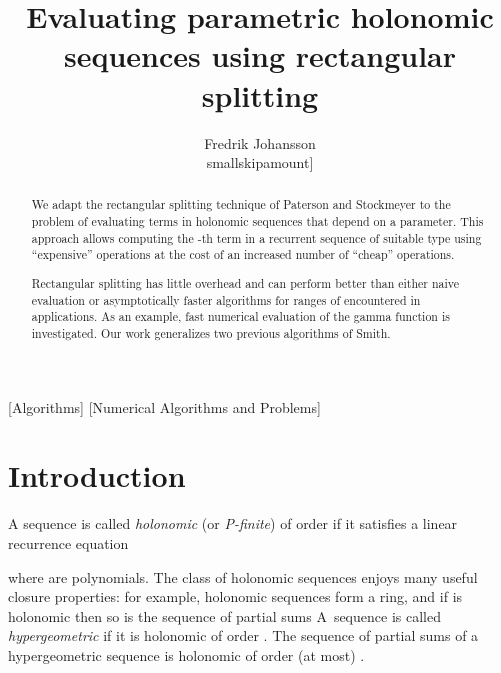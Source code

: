 \documentclass{sig-alternate}
\begin{document}
\title{Evaluating parametric holonomic sequences using rectangular splitting}


\author{\alignauthor Fredrik Johansson\\smallskipamount]
}

\maketitle

\begin{abstract}
We adapt the rectangular splitting technique of
Paterson and Stockmeyer to the problem of evaluating
terms in holonomic sequences that depend on a parameter.
This approach allows computing the -th term
in a recurrent sequence of suitable type using  ``expensive'' operations
at the cost of an increased number of ``cheap'' operations.

Rectangular splitting has little overhead and can perform better
than either naive evaluation or asymptotically faster algorithms
for ranges of  encountered in applications.
As an example,
fast numerical evaluation of the gamma function is investigated.
Our work generalizes two previous algorithms of Smith.
\end{abstract}

[Algorithms]
[Numerical Algorithms and Problems]



\overfullrule=5pt

\section{Introduction}

A sequence  is called \emph{holonomic}
(or \emph{P-finite}) of order  if it satisfies a linear recurrence equation

where  are polynomials.
The class of holonomic sequences enjoys many useful closure properties:
for example, holonomic sequences form a ring, and if  is holonomic
then so is the sequence of partial sums 
A~sequence is called \emph{hypergeometric} if it is holonomic of
order . The sequence of partial sums of a hypergeometric sequence
is holonomic of  order (at most) .
\end{document}
